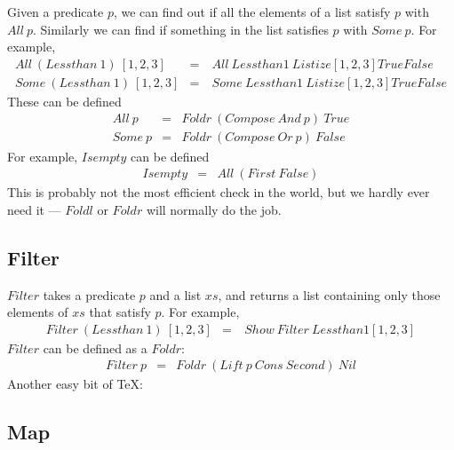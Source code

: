 Given a predicate $p$, we can find out if all the elements of
a list satisfy $p$ with $All~p$.  Similarly we can find if something
in the list satisfies $p$ with $Some~p$.  For example,
\begin{eqnarray*}
   All~(Lessthan~1)~[1,2,3]  
   &  =  &  \ All{\ Lessthan 1}{\ Listize[1,2,3]}{True}{False}  \\
   Some~(Lessthan~1)~[1,2,3]  
   &  =  &  \ Some{\ Lessthan 1}{\ Listize[1,2,3]}{True}{False}
\end{eqnarray*}
These can be defined
\begin{eqnarray*}
    All~p  &  =  &  Foldr~(Compose~And~p)~True  \\
   Some~p  &  =  &  Foldr~(Compose~Or~p)~False
\end{eqnarray*}
For example, $Isempty$ can be defined
\begin{eqnarray*}
   Isempty  &  =  &  All~(First~False)
\end{eqnarray*}
This is probably not the most efficient check in the world, but we
hardly ever need it --- $Foldl$ or $Foldr$ will normally do the job.
\begin{teX}
\def\All#1{\Foldr{\Compose\And{#1}}\True}
\def\Some#1{\Foldr{\Compose\Or{#1}}\False}
\def\Isempty{\All{\First\False}}
\end{teX}

\subsection{Filter}

$Filter$ takes a predicate $p$ and a list $xs$, and returns a list
containing only those elements of $xs$ that satisfy $p$.  For example,
\begin{eqnarray*}
   Filter~(Lessthan~1)~[1,2,3]  &  =  &  \ Show\ Filter{\ Lessthan 1}[1,2,3]
\end{eqnarray*}
$Filter$ can be defined as a $Foldr$:
\begin{eqnarray*}
   Filter~p  &  =  &  Foldr~(Lift~p~Cons~Second)~Nil
\end{eqnarray*}
Another easy bit of \TeX:



\subsection{Map}

